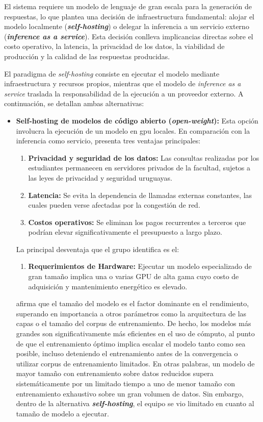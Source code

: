 El sistema requiere un modelo de lenguaje de gran escala para la generación de respuestas, lo que plantea una decisión de infraestructura fundamental: alojar el modelo localmente (\textbf{\textit{self-hosting}}) o delegar la inferencia a un servicio externo (\textbf{\textit{inference as a service}}). Esta decisión conlleva implicancias directas sobre el costo operativo, la latencia, la privacidad de los datos, la viabilidad de producción y la calidad de las respuestas producidas.

El paradigma de \textit{self-hosting} consiste en ejecutar el modelo mediante infraestructura y recursos propios, mientras que el modelo de \textit{inference as a service} traslada la responsabilidad de la ejecución a un proveedor externo. A continuación, se detallan ambas alternativas:

\begin{itemize}

\item \textbf{Self-hosting de modelos de código abierto (\textit{open-weight}):} Esta opción involucra la ejecución de un modelo en \acrshort{gpu} locales. En comparación con la inferencia como servicio, presenta tres ventajas principales:
\begin{enumerate}
\item \textbf{Privacidad y seguridad de los datos:} Las consultas realizadas por los estudiantes permanecen en servidores privados de la facultad, sujetos a las leyes de privacidad y seguridad uruguayas.
\item \textbf{Latencia:} Se evita la dependencia de llamadas externas constantes, las cuales pueden verse afectadas por la congestión de red.
\item \textbf{Costos operativos:} Se eliminan los pagos recurrentes a terceros que podrían elevar significativamente el presupuesto a largo plazo.
\end{enumerate}

La principal desventaja que el grupo identifica es el:
\begin{enumerate}
\item \textbf{Requerimientos de Hardware:} Ejecutar un modelo especializado de gran tamaño implica una o varias GPU de alta gama cuyo costo de adquisición y mantenimiento energético es elevado.
\end{enumerate}

\cite{kaplan2020scalingTamanoporsobretodo} afirma que el tamaño del modelo es el factor dominante en el rendimiento, superando en importancia a otros parámetros como la arquitectura de las capas o el tamaño del corpus de entrenamiento. De hecho, los modelos más grandes son significativamente más eficientes en el uso de cómputo, al punto de que el entrenamiento óptimo implica escalar el modelo tanto como sea posible, incluso deteniendo el entrenamiento antes de la convergencia o utilizar corpus de entrenamiento limitados. En otras palabras, un modelo de mayor tamaño con entrenamiento sobre datos reducidos supera sistemáticamente por un limitado tiempo a uno de menor tamaño con entrenamiento exhaustivo sobre un gran volumen de datos. Sin embargo, dentro de la alternativa \textbf{\textit{self-hosting}}, el equipo se vio limitado en cuanto al tamaño de modelo a ejecutar.


\end{itemize}
